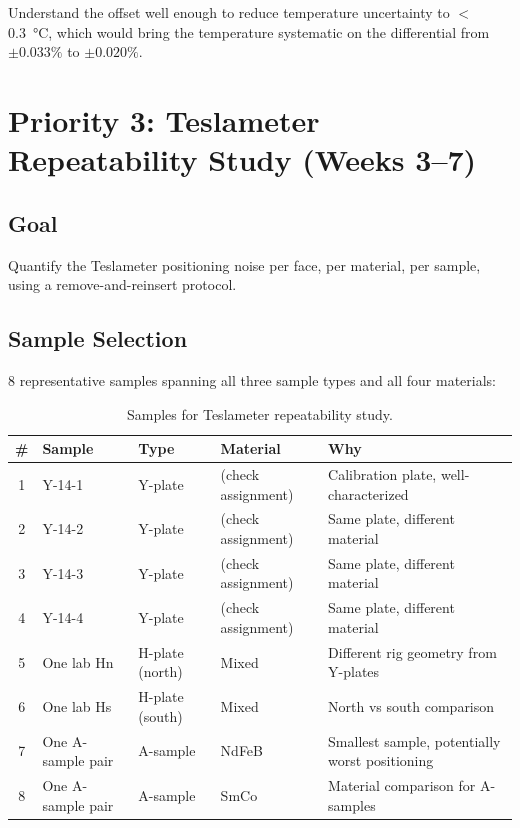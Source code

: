 \documentclass[11pt,letterpaper]{article}
\begin{document}
Understand the offset well enough to reduce temperature uncertainty to
$<$\SI{0.3}{\degreeCelsius}, which would bring the temperature systematic on the
differential from $\pm 0.033\%$ to $\pm 0.020\%$.


\section{Priority 3: Teslameter Repeatability Study (Weeks 3--7)}
\label{sec:p3}

\subsection{Goal}

Quantify the Teslameter positioning noise per face, per material, per sample,
using a remove-and-reinsert protocol.

\subsection{Sample Selection}

8 representative samples spanning all three sample types and all four materials:

\begin{table}[htbp]
\centering
\caption{Samples for Teslameter repeatability study.}
\label{tab:p3-samples}
\begin{tabular}{@{}clllp{5cm}@{}}
\toprule
\# & Sample & Type & Material & Why \\
\midrule
1 & Y-14-1 & Y-plate       & (check assignment) & Calibration plate, well-characterized \\
2 & Y-14-2 & Y-plate       & (check assignment) & Same plate, different material \\
3 & Y-14-3 & Y-plate       & (check assignment) & Same plate, different material \\
4 & Y-14-4 & Y-plate       & (check assignment) & Same plate, different material \\
5 & One lab Hn & H-plate (north) & Mixed & Different rig geometry from Y-plates \\
6 & One lab Hs & H-plate (south) & Mixed & North vs south comparison \\
7 & One A-sample pair & A-sample & NdFeB & Smallest sample, potentially worst positioning \\
8 & One A-sample pair & A-sample & SmCo & Material comparison for A-samples \\
\bottomrule
\end{tabular}
\end{table}
\end{document}
